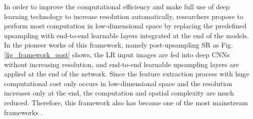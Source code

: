 \label{sec_framework_post}
In order to improve the computational efficiency and make full use of deep learning technology to increase resolution automatically, researchers propose to perform most computation in low-dimensional space by replacing the predefined upsampling with end-to-end learnable layers integrated at the end of the models.
In the pioneer works  of this framework, namely post-upsampling SR as Fig. \ref{fig_framework_post} shows, the LR input images are fed into deep CNNs without increasing resolution, and end-to-end learnable upsampling layers are applied at the end of the network.
Since the feature extraction process with huge computational cost only occurs in low-dimensional space and the resolution increases only at the end, the computation and spatial complexity are much reduced.
Therefore, this framework also has become one of the most mainstream frameworks .
